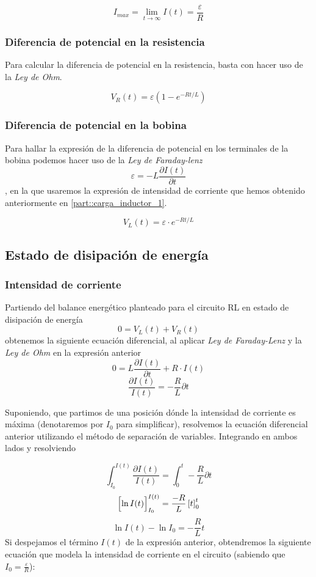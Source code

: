 \documentclass[../main.tex]{subfiles}
\begin{document}
$$I_{max} = \lim_{t \to \infty} I(t) = \frac{\varepsilon}{R}$$


\subsubsection{Diferencia de potencial en la resistencia}
\label{part::carga_inductor_2}
Para calcular la diferencia de potencial en la resistencia, basta con hacer uso de la \textit{Ley de Ohm}.

$$V_R(t) = \varepsilon \left( 1 - e^{-Rt/L}\right)$$

\subsubsection{Diferencia de potencial en la bobina}
\label{part::carga_inductor_3}
Para hallar la expresión de la diferencia de potencial en los terminales de la bobina podemos hacer uso de la \textit{Ley de Faraday-lenz}
$$\varepsilon = -L \frac{\partial I(t)}{\partial t}$$
, en la que usaremos la expresión de intensidad de corriente que hemos obtenido anteriormente en \ref{part::carga_inductor_1}.

$$V_L(t) = \varepsilon \cdot e^{-Rt/L}$$

\subsection{Estado de disipación de energía}


\subsubsection{Intensidad de corriente}
\label{part::descarga_inductor1}
Partiendo del balance energético planteado para el circuito RL en estado de disipación de energía
$$0 = V_L(t) + V_R(t)$$
obtenemos la siguiente ecuación diferencial, al aplicar \textit{Ley de Faraday-Lenz} y la \textit{Ley de Ohm} en la expresión anterior
$$0 = L\frac{\partial I(t)}{\partial t} + R \cdot I(t)$$
$$\frac{\partial I(t)}{I(t)} = -\frac{R}{L}\partial t $$
 
Suponiendo, que partimos de una posición dónde la intensidad de corriente es máxima (denotaremos por $I_0$ para simplificar), resolvemos la ecuación diferencial anterior utilizando el método de separación de variables. Integrando en ambos lados y resolviendo

$$\int_{I_0}^{I(t)} \frac{\partial I(t)}{I(t)} = \int_0^{t} -\frac{R}{L}\partial t $$
$$\Bigl[ \ln{I(t)} \Bigr]_{I_0}^{I(t)} = \frac{-R}{L} \left[ t \right]_0^{t}$$
$$\ln{I(t)} - \ln{I_0} = -\frac{R}{L}t$$
Si despejamos el término $I(t)$ de la expresión anterior, obtendremos la siguiente ecuación que modela la intensidad de corriente en el circuito (sabiendo que $I_0 = \frac{\varepsilon}{R}$):
\end{document}
